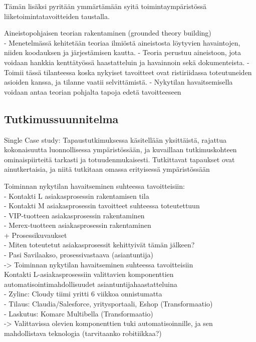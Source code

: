 \documentclass[finnish,12pt,a4paper,pdftex]{article}
\begin{document}
Tämän lisäksi pyritään ymmärtämään syitä toimintaympäristössä liiketoimintatavoitteiden taustalla. 

Aineistopohjaisen teorian rakentaminen (grounded theory building)\\
- Menetelmässä kehitetään teoriaa ilmiöstä aineistosta löytyvien havaintojen, niiden koodauksen ja järjestämisen kautta.
- Teoria perustuu aineistoon, jota voidaan hankkia kenttätyössä haastatteluin ja havainnoin sekä dokumenteista.
- Toimii tässä tilanteessa koska nykyiset tavoitteet ovat ristiriidassa toteutuneiden asioiden kanssa, ja tilanne vaatii selvittämistä.
- Nykytilan havaitsemisella voidaan antaa teorian pohjalta tapoja edetä tavoitteeseen

\subsection{Tutkimussuunnitelma}

Single Case study: Tapaustutkimuksessa käsitellään yksittäistä, rajattua kokonaisuutta luonnollisessa ympäristössään, ja kuvaillaan tutkimuskohteen ominaispiirteitä tarkasti ja totuudenmukaisesti. Tutkittavat tapaukset ovat ainutkertaisia, ja niitä tutkitaan omassa erityisessä ympäristössään

Toiminnan nykytilan havaitseminen suhteessa tavoitteisiin:\\
- Kontakti L asiakasprosessin rakentamisen tila\\
- Kontakti M asiakasprosessin tavoitteet suhteessa toteutettuun\\
- VIP-tuotteen asiakasprosessin rakentaminen\\
- Merex-tuotteen asiakasprosessin rakentaminen\\
+ Prosessikuvaukset\\
- Miten toteutetut asiakasprosessit kehittyivät tämän jälkeen?\\
- Pasi Savilaakso, prosessivastaava (asiantuntija)\\
-> Toiminnan nykytilan havaitseminen suhteessa tavoitteisiin\\

Kontakti L-asiakasprosessiin valittavien komponenttien automatisointimahdollisuudet asiantuntijahaastatteluina\\
- Zylinc: Cloudy tiimi yritti 6 viikkoa onnistumatta\\
- Tilaus: Claudia/Salesforce, yritysportaali, Eshop (Transformaatio)\\
- Laskutus: Komarc Multibella (Transformaatio)\\
-> Valittavissa olevien komponenttien tuki automatisoinnille, ja sen mahdollistava teknologia (tarvitaanko robitiikkaa?)\\
\end{document}
